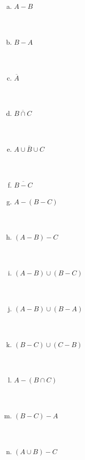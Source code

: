 \documentclass[a4paper,14pt]{article}
\begin{document}
\begin{multicols}{2}
\begin{enumerate}
\begin{enumerate}[a)]
   				\item $A - B$ \\\\\\
   				\item $B - A$ \\\\\\
   				\item $\overline{A}$ \\\\\\
   				\item $\overline{B \cap C}$ \\\\\\
   				\item $\overline{A \cup B \cup C}$ \\\\\\
   				\item $\overline{B - C}$ \newline
   				\item $A - (B - C)$ \\\\\\
   				\item $(A - B) - C$ \\\\\\
   				\item $(A - B) \cup (B - C)$ \\\\\\
   				\item $(A - B) \cup (B - A)$ \\\\\\
   				\item $(B - C) \cup (C - B)$ \\\\\\
   				\item $A - (B \cap C)$ \\\\\\
   				\item $(B - C) - A$ \\\\\\
   				\item $(A \cup B) - C$ \\\\\\

\end{enumerate}
\end{enumerate}
\end{multicols}
\end{document}
